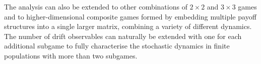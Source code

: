 \documentclass[%
 reprint,
 amsmath,amssymb,
 aps,
]{revtex4-2}
\begin{document}
The analysis can also be extended to other combinations of $2 \times 2$ and 
$3 \times 3$ games and to higher-dimensional composite games
formed by embedding multiple payoff structures into a single larger matrix, combining a variety of
different dynamics. The number of drift observables can naturally be extended 
with one for each additional subgame
to fully characterise the stochastic dynamics in finite populations with more than two subgames.

\clearpage
\nocite{*}


\end{document}
